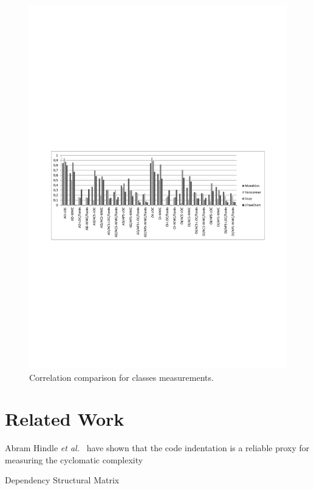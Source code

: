 \documentclass{sig-alternate}
\newcommand{\etal}{\emph{et al.}\xspace}
\newcommand{\figlabel}[1]{\label{fig:#1}}
\begin{document}
\begin{figure}
\includegraphics[bb=52bp 300bp 540bp 500bp,clip]{ClassesMetricsComparison}

\caption{Correlation comparison for classes measurements.\figlabel{Correlation-comparison}}


\end{figure}




\section{Related Work}

Abram Hindle \etal~\cite{Hind08a} have shown that the code indentation is a reliable proxy for measuring the cyclomatic complexity

Dependency Structural Matrix~\cite{Sang05a}
\end{document}
